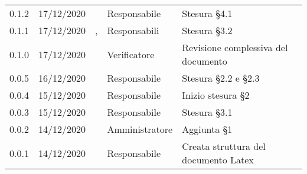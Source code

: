 {\begin{longtable}{c C{2.6cm} C{3cm} C{2.6cm} C{5cm}}
0.1.2 & 17/12/2020 & \SG{} & Responsabile & Stesura \S 4.1 \\

0.1.1 & 17/12/2020 & \SG{},\newline \BM{} & Responsabili & Stesura \S 3.2 \\

0.1.0 & 17/12/2020 & \PA{} & Verificatore & Revisione complessiva del documento \\

0.0.5 & 16/12/2020 & \BM{} & Responsabile & Stesura \S 2.2 e \S 2.3 \\
		
0.0.4 & 15/12/2020 & \BM{} & Responsabile & Inizio stesura \S 2 \\

0.0.3 & 15/12/2020 & \SG{} & Responsabile & Stesura \S 3.1 \\

0.0.2 & 14/12/2020 & \PA{} & Amministratore & Aggiunta \S 1 \\

0.0.1 & 14/12/2020 & \SG{} & Responsabile & Creata struttura del documento Latex \\
		
\end{longtable}
}
